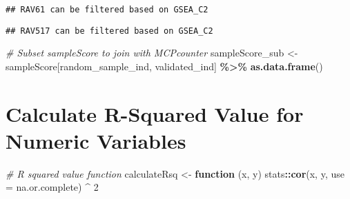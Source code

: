 \documentclass[
]{article}
\newenvironment{Shaded}{\begin{snugshade}}{\end{snugshade}}
\newcommand{\AttributeTok}[1]{\textcolor[rgb]{0.13,0.29,0.53}{#1}}
\newcommand{\CommentTok}[1]{\textcolor[rgb]{0.56,0.35,0.01}{\textit{#1}}}
\newcommand{\ControlFlowTok}[1]{\textcolor[rgb]{0.13,0.29,0.53}{\textbf{#1}}}
\newcommand{\DecValTok}[1]{\textcolor[rgb]{0.00,0.00,0.81}{#1}}
\newcommand{\FunctionTok}[1]{\textcolor[rgb]{0.13,0.29,0.53}{\textbf{#1}}}
\newcommand{\NormalTok}[1]{#1}
\newcommand{\OtherTok}[1]{\textcolor[rgb]{0.56,0.35,0.01}{#1}}
\newcommand{\SpecialCharTok}[1]{\textcolor[rgb]{0.81,0.36,0.00}{\textbf{#1}}}
\newcommand{\StringTok}[1]{\textcolor[rgb]{0.31,0.60,0.02}{#1}}
\begin{document}
\begin{verbatim}
## RAV61 can be filtered based on GSEA_C2
\end{verbatim}

\begin{verbatim}
## RAV517 can be filtered based on GSEA_C2
\end{verbatim}

\begin{Shaded}
\begin{Highlighting}[]
\CommentTok{\# Subset sampleScore to join with MCPcounter}
\NormalTok{sampleScore\_sub }\OtherTok{\textless{}{-}}\NormalTok{ sampleScore[random\_sample\_ind, validated\_ind] }\SpecialCharTok{\%\textgreater{}\%} \FunctionTok{as.data.frame}\NormalTok{()}
\end{Highlighting}
\end{Shaded}

\hypertarget{calculate-r-squared-value-for-numeric-variables}{%
\section{Calculate R-Squared Value for Numeric
Variables}\label{calculate-r-squared-value-for-numeric-variables}}

\begin{Shaded}
\begin{Highlighting}[]
\CommentTok{\# R squared value function}
\NormalTok{calculateRsq }\OtherTok{\textless{}{-}} \ControlFlowTok{function}\NormalTok{ (x, y) stats}\SpecialCharTok{::}\FunctionTok{cor}\NormalTok{(x, y, }\AttributeTok{use =} \StringTok{\textquotesingle{}na.or.complete\textquotesingle{}}\NormalTok{) }\SpecialCharTok{\^{}} \DecValTok{2}
\end{Highlighting}
\end{Shaded}
\end{document}

